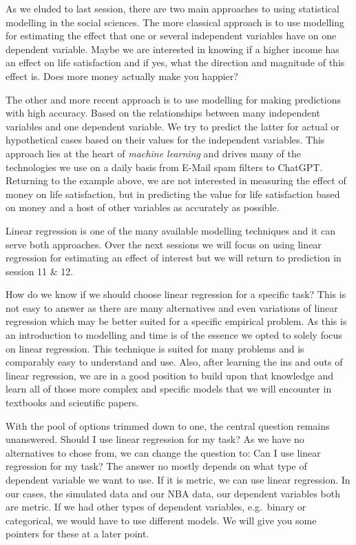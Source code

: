 \documentclass[
]{book}
\begin{document}
As we eluded to last session, there are two main approaches to using
statistical modelling in the social sciences.
The more classical approach is to use modelling for estimating the effect that
one or several independent variables have on one dependent variable. Maybe we
are interested in knowing if a higher income has an effect on life satisfaction
and if yes, what the direction and magnitude of this effect is. Does more money
actually make you happier?

The other and more recent approach is to use modelling for making predictions
with high accuracy. Based on the relationships between many independent
variables and one dependent variable. We try to predict the latter for actual
or hypothetical cases based on their values for the independent variables.
This approach lies at the heart of \emph{machine learning} and drives many of the
technologies we use on a daily basis from E-Mail spam filters to ChatGPT.
Returning to the example above, we are not interested in measuring the effect
of money on life satisfaction, but in predicting the value for life satisfaction
based on money and a host of other variables as accurately as possible.

Linear regression is one of the many available modelling techniques and it can
serve both approaches. Over the next sessions we will focus on using
linear regression for estimating an effect of interest but we will return to
prediction in session 11 \& 12.

How do we know if we should choose linear regression for a specific task?
This is not easy to answer as there are many alternatives and even variations of
linear regression which may be better suited for a specific empirical problem.
As this is an introduction to modelling and time is of the essence we opted to
solely focus on linear regression. This technique is suited for many problems and
is comparably easy to understand and use. Also, after learning the ins and outs
of linear regression, we are in a good position to build upon that knowledge and
learn all of those more complex and specific models that we will encounter in
textbooks and scientific papers.

With the pool of options trimmed down to one, the central question remains unanswered.
Should I use linear regression for my task? As we have no alternatives to chose
from, we can change the question to: Can I use linear regression for my task?
The answer no mostly depends on what type of dependent variable we want to use.
If it is metric, we can use linear regression. In our cases, the simulated data
and our NBA data, our dependent variables both are metric. If we had other types
of dependent variables, e.g.~binary or categorical, we would have to use different
models. We will give you some pointers for these at a later point.
\end{document}
